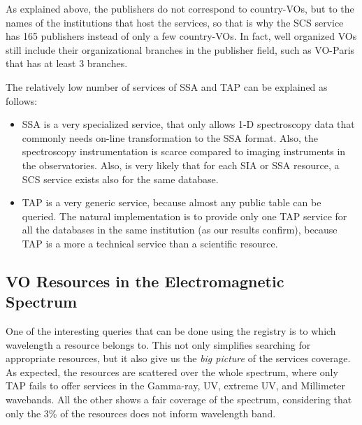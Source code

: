 As explained above, the publishers do not correspond to country-VOs, but 
to the names of the institutions that host the services, so that is why the SCS
service has 165 publishers instead of only a few country-VOs. In fact, well
organized VOs still include their organizational branches in the publisher field,
such as VO-Paris that has at least 3 branches.

The relatively low number of services of SSA and TAP can be explained as follows:
\begin{itemize}
\item SSA is a very specialized service, that only allows 1-D spectroscopy data that commonly 
needs on-line transformation to the SSA format. Also, the spectroscopy instrumentation is
scarce compared to imaging instruments in the observatories. Also, is very likely that for each
SIA or SSA resource, a SCS service exists also for the same database.
\item TAP is a very generic service, because almost any public table can be queried. 
The natural implementation is to provide only one TAP service for all the databases
in the same institution (as our results confirm), because TAP is a more a technical 
service than a scientific resource. 
\end{itemize} 

\subsection{VO Resources in the Electromagnetic Spectrum}

One of the interesting queries that can be done using the registry is
to which wavelength a resource belongs to. This not only simplifies
searching for appropriate resources, but it also give us the 
\emph{big picture} of the services coverage. As expected, 
the resources are scattered over the whole spectrum, where
only TAP fails to offer services in the Gamma-ray, UV, extreme UV, and Millimeter
wavebands. All the other shows a fair coverage of the spectrum, considering
that only the 3\% of the resources does not inform wavelength band. 


